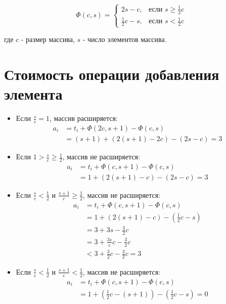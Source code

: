 \documentclass{article}
\begin{document}
$$
\Phi(c, s)=\left\{
\begin{array}{ll}
2s - c, & \text{если } s \geqslant \frac{1}{2}c \\
\frac{1}{2}c - s, & \text{если } s < \frac{1}{2}c
\end{array}
\right.
$$

где \( c \) - размер массива, \( s \) - число элементов массива.


\section{Стоимость операции добавления элемента}

\begin{itemize}
    \item Если $\frac{s}{c} = 1$, массив расширяется:
        \begin{align*}
            a_i &= t_i + \Phi(2c, s+1) - \Phi(c, s) \\
            &= (s+1) + (2(s+1) - 2c) - (2s - c) = 3
        \end{align*}
    \item Если $1 > \frac{s}{c} \geqslant \frac{1}{2}$, массив не расширяется:
        \begin{align*}
            a_i &= t_i + \Phi(c, s+1) - \Phi(c, s) \\
            &= 1 + (2(s+1) - c) - (2s - c) = 3
        \end{align*}
    
    \item Если $\frac{s}{c} < \frac{1}{2}$ и $\frac{s+1}{c} \geqslant \frac{1}{2}$, массив не расширяется:
        \begin{align*}
            a_i &= t_i + \Phi(c, s+1) - \Phi(c, s) \\
            &= 1 + (2(s+1) - c) - \left(\frac{1}{2}c - s\right) \\
            &= 3 + 3s - \frac{3}{2}c \\
            &= 3 + \frac{3s}{c}c - \frac{3}{2}c \\
            &< 3 + \frac{3}{2}c - \frac{3}{2}c = 3
        \end{align*}
    
    \item Если $\frac{s}{c} < \frac{1}{2}$ и $\frac{s+1}{c} < \frac{1}{2}$, массив не расширяется:
        \begin{align*}
            a_i &= t_i + \Phi(c, s+1) - \Phi(c, s) \\
            &= 1 + \left(\frac{1}{2}c - (s+1)\right) - \left(\frac{1}{2}c - s\right) = 0
        \end{align*}
\end{itemize}
\end{document}
